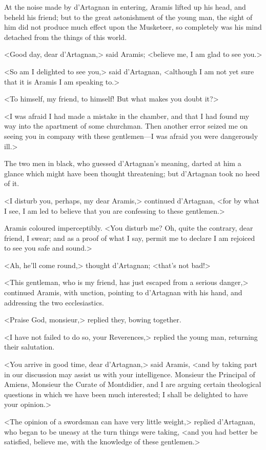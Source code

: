 At the noise made by d'Artagnan in entering, Aramis lifted up his head, and beheld his friend; but to the great astonishment of the young man, the sight of him did not produce much effect upon the Musketeer, so completely was his mind detached from the things of this world. 

<Good day, dear d'Artagnan,> said Aramis; <believe me, I am glad to see you.> 

<So am I delighted to see you,> said d'Artagnan, <although I am not yet sure that it is Aramis I am speaking to.> 

<To himself, my friend, to himself! But what makes you doubt it?> 

<I was afraid I had made a mistake in the chamber, and that I had found my way into the apartment of some churchman. Then another error seized me on seeing you in company with these gentlemen---I was afraid you were dangerously ill.> 

The two men in black, who guessed d'Artagnan's meaning, darted at him a glance which might have been thought threatening; but d'Artagnan took no heed of it. 

<I disturb you, perhaps, my dear Aramis,> continued d'Artagnan, <for by what I see, I am led to believe that you are confessing to these gentlemen.> 

Aramis coloured imperceptibly. <You disturb me? Oh, quite the contrary, dear friend, I swear; and as a proof of what I say, permit me to declare I am rejoiced to see you safe and sound.> 

<Ah, he'll come round,> thought d'Artagnan; <that's not bad!> 

<This gentleman, who is my friend, has just escaped from a serious danger,> continued Aramis, with unction, pointing to d'Artagnan with his hand, and addressing the two ecclesiastics. 

<Praise God, monsieur,> replied they, bowing together. 

<I have not failed to do so, your Reverences,> replied the young man, returning their salutation. 

<You arrive in good time, dear d'Artagnan,> said Aramis, <and by taking part in our discussion may assist us with your intelligence. Monsieur the Principal of Amiens, Monsieur the Curate of Montdidier, and I are arguing certain theological questions in which we have been much interested; I shall be delighted to have your opinion.> 

<The opinion of a swordsman can have very little weight,> replied d'Artagnan, who began to be uneasy at the turn things were taking, <and you had better be satisfied, believe me, with the knowledge of these gentlemen.> 

